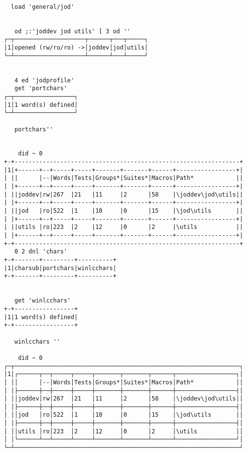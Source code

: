 ﻿\begin{lstlisting}[frame=single,framerule=0pt,basicstyle=\ttfamily\footnotesize,extendedchars=true]
   
  load 'general/jod'
   
   
   od ;:'joddev jod utils' [ 3 od ''
┌─┬────────────────────┬──────┬───┬─────┐
│1│opened (rw/ro/ro) ->│joddev│jod│utils│
└─┴────────────────────┴──────┴───┴─────┘
   
   
   4 ed 'jodprofile'
   get 'portchars'
┌─┬─────────────────┐
│1│1 word(s) defined│
└─┴─────────────────┘
   
   portchars''

   
    did ~ 0
+-+----------------------------------------------------------------+
|1|+------+--+-----+-----+-------+-------+------+-----------------+|
| ||      |--|Words|Tests|Groups*|Suites*|Macros|Path*            ||
| |+------+--+-----+-----+-------+-------+------+-----------------+|
| ||joddev|rw|267  |21   |11     |2      |58    |\joddev\jod\utils||
| |+------+--+-----+-----+-------+-------+------+-----------------+|
| ||jod   |ro|522  |1    |10     |0      |15    |\jod\utils       ||
| |+------+--+-----+-----+-------+-------+------+-----------------+|
| ||utils |ro|223  |2    |12     |0      |2     |\utils           ||
| |+------+--+-----+-----+-------+-------+------+-----------------+|
+-+----------------------------------------------------------------+
   0 2 dnl 'chars'
+-+-------+---------+----------+
|1|charsub|portchars|winlcchars|
+-+-------+---------+----------+
   
   
   get 'winlcchars'
+-+-----------------+
|1|1 word(s) defined|
+-+-----------------+
   
   winlcchars ''

    did ~ 0
┌─┬────────────────────────────────────────────────────────────────┐
│1│┌──────┬──┬─────┬─────┬───────┬───────┬──────┬─────────────────┐│
│ ││      │--│Words│Tests│Groups*│Suites*│Macros│Path*            ││
│ │├──────┼──┼─────┼─────┼───────┼───────┼──────┼─────────────────┤│
│ ││joddev│rw│267  │21   │11     │2      │58    │\joddev\jod\utils││
│ │├──────┼──┼─────┼─────┼───────┼───────┼──────┼─────────────────┤│
│ ││jod   │ro│522  │1    │10     │0      │15    │\jod\utils       ││
│ │├──────┼──┼─────┼─────┼───────┼───────┼──────┼─────────────────┤│
│ ││utils │ro│223  │2    │12     │0      │2     │\utils           ││
│ │└──────┴──┴─────┴─────┴───────┴───────┴──────┴─────────────────┘│
└─┴────────────────────────────────────────────────────────────────┘
  
\end{lstlisting} 